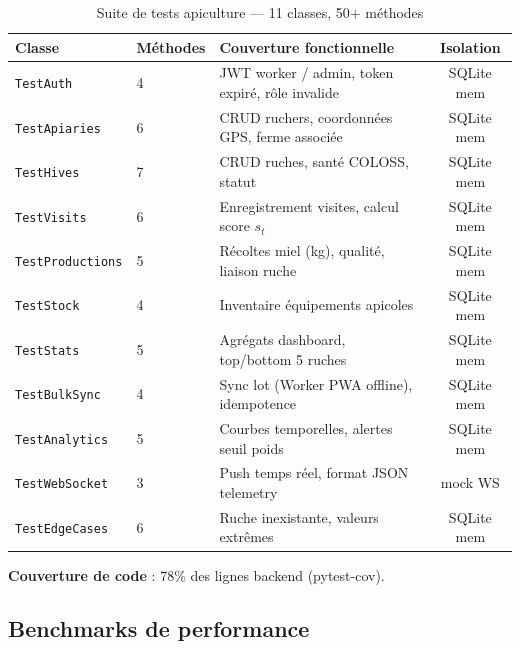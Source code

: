 \begin{table}[H]
\caption{Suite de tests apiculture — 11 classes, 50+ méthodes}
\label{tab:bee_tests}
\centering
\begin{tabularx}{\textwidth}{@{}l l X c@{}}
\toprule
\textbf{Classe} & \textbf{Méthodes} & \textbf{Couverture fonctionnelle} & \textbf{Isolation} \\
\midrule
\texttt{TestAuth}         & 4  & JWT worker / admin, token expiré, rôle invalide & SQLite mem \\
\texttt{TestApiaries}     & 6  & CRUD ruchers, coordonnées GPS, ferme associée   & SQLite mem \\
\texttt{TestHives}        & 7  & CRUD ruches, santé COLOSS, statut               & SQLite mem \\
\texttt{TestVisits}       & 6  & Enregistrement visites, calcul score $s_t$      & SQLite mem \\
\texttt{TestProductions}  & 5  & Récoltes miel (kg), qualité, liaison ruche      & SQLite mem \\
\texttt{TestStock}        & 4  & Inventaire équipements apicoles                 & SQLite mem \\
\texttt{TestStats}        & 5  & Agrégats dashboard, top/bottom 5 ruches         & SQLite mem \\
\texttt{TestBulkSync}     & 4  & Sync lot (Worker PWA offline), idempotence      & SQLite mem \\
\texttt{TestAnalytics}    & 5  & Courbes temporelles, alertes seuil poids        & SQLite mem \\
\texttt{TestWebSocket}    & 3  & Push temps réel, format JSON telemetry          & mock WS \\
\texttt{TestEdgeCases}    & 6  & Ruche inexistante, valeurs extrêmes             & SQLite mem \\
\bottomrule
\end{tabularx}
\end{table}

\textbf{Couverture de code} : 78\% des lignes backend (pytest-cov).

\subsection{Benchmarks de performance}

